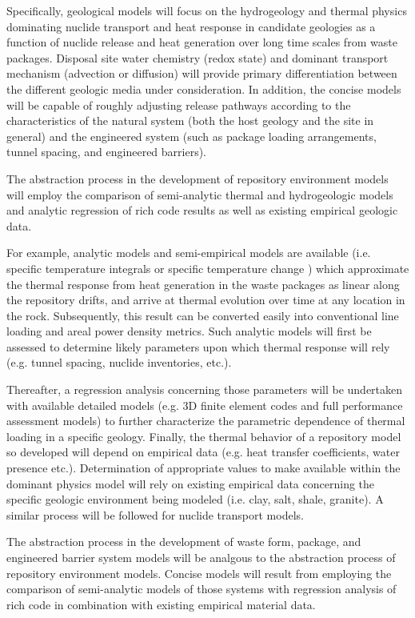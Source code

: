 Specifically, geological models will focus on the hydrogeology and 
thermal physics dominating nuclide transport and heat response in 
candidate geologies as a function of nuclide release and heat 
generation over long time scales from waste packages.  Disposal site 
water chemistry (redox state) and dominant transport mechanism 
(advection or diffusion) will provide primary differentiation between 
the different geologic media under consideration. In addition, the 
concise models will be capable of roughly adjusting release pathways 
according to the characteristics of the natural system (both the host 
geology and the site in general) and the engineered system (such as 
package loading arrangements, tunnel spacing, and engineered 
barriers).

The abstraction process in the development of repository environment 
models will employ the comparison of semi-analytic thermal and 
hydrogeologic models and analytic regression of rich code results as 
well as existing empirical geologic data.  

For example, analytic models and semi-empirical models are available 
(i.e. specific temperature integrals \cite{li_methodology_2006} or 
specific temperature change \cite{radel_effect_2007}) which 
approximate the thermal response from heat generation in the waste 
packages as linear along the repository drifts, and arrive at thermal 
evolution over time at any location in the rock. Subsequently, this 
result can be converted easily into conventional line loading and 
areal power density metrics.  Such analytic models will first be 
assessed to determine likely parameters upon which thermal response 
will rely (e.g. tunnel spacing, nuclide inventories, etc.).

Thereafter, a regression analysis concerning those parameters will be 
undertaken with available detailed models (e.g. 3D finite element 
codes and full performance assessment models) to further characterize 
the parametric dependence of thermal loading in a specific geology.  
Finally, the thermal behavior of a repository model so developed will 
depend on empirical data (e.g.  heat transfer coefficients, water 
presence etc.). Determination of appropriate values to make available 
within the dominant physics model will rely on existing empirical data 
concerning the specific geologic environment being modeled (i.e. clay, 
salt, shale, granite). A similar process will be followed for nuclide 
transport models.

The abstraction process in the development of waste form, package, and 
engineered barrier system models will be analgous to the abstraction 
process of repository environment models. Concise models will result 
from employing the comparison of semi-analytic models of those systems 
with regression analysis of rich code in combination with existing 
empirical material data.

